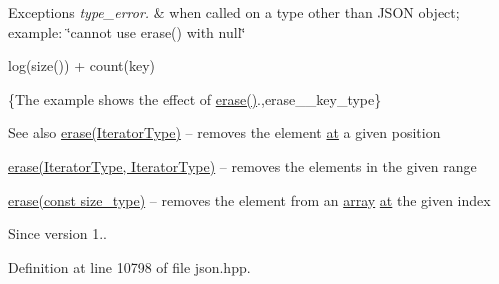 \begin{DoxyExceptions}{Exceptions}
{\em type\+\_\+error.} & when called on a type other than J\+S\+ON object; example\+: {\ttfamily \char`\"{}cannot use erase() with null\char`\"{}}\\
\hline
\end{DoxyExceptions}
{\ttfamily log(size()) + count(key)}

\{The example shows the effect of {\ttfamily \hyperlink{classnlohmann_1_1basic__json_a068a16e76be178e83da6a192916923ed}{erase()}}.,erase\+\_\+\+\_\+key\+\_\+type\}

\begin{DoxySeeAlso}{See also}
\hyperlink{classnlohmann_1_1basic__json_a068a16e76be178e83da6a192916923ed}{erase(\+Iterator\+Type)} -- removes the element \hyperlink{classnlohmann_1_1basic__json_a73ae333487310e3302135189ce8ff5d8}{at} a given position 

\hyperlink{classnlohmann_1_1basic__json_a4b3f7eb2d4625d95a51fbbdceb7c5f39}{erase(\+Iterator\+Type, Iterator\+Type)} -- removes the elements in the given range 

\hyperlink{classnlohmann_1_1basic__json_a88cbcefe9a3f4d294bed0653550a5cb9}{erase(const size\+\_\+type)} -- removes the element from an \hyperlink{classnlohmann_1_1basic__json_aa80485befaffcadaa39965494e0b4d2e}{array} \hyperlink{classnlohmann_1_1basic__json_a73ae333487310e3302135189ce8ff5d8}{at} the given index
\end{DoxySeeAlso}
\begin{DoxySince}{Since}
version 1.. 
\end{DoxySince}


Definition at line 10798 of file json.\+hpp.

